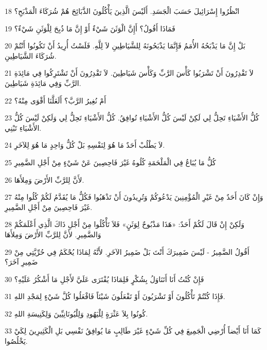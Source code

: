 \par 18 انْظُرُوا إِسْرَائِيلَ حَسَبَ الْجَسَدِ. أَلَيْسَ الَّذِينَ يَأْكُلُونَ الذَّبَائِحَ هُمْ شُرَكَاءَ الْمَذْبَحِ؟
\par 19 فَمَاذَا أَقُولُ؟ أَإِنَّ الْوَثَنَ شَيْءٌ أَوْ إِنَّ مَا ذُبِحَ لِلْوَثَنِ شَيْءٌ؟
\par 20 بَلْ إِنَّ مَا يَذْبَحُهُ الأُمَمُ فَإِنَّمَا يَذْبَحُونَهُ لِلشَّيَاطِينِ لاَ لِلَّهِ. فَلَسْتُ أُرِيدُ أَنْ تَكُونُوا أَنْتُمْ شُرَكَاءَ الشَّيَاطِينِ.
\par 21 لاَ تَقْدِرُونَ أَنْ تَشْرَبُوا كَأْسَ الرَّبِّ وَكَأْسَ شَيَاطِينَ. لاَ تَقْدِرُونَ أَنْ تَشْتَرِكُوا فِي مَائِدَةِ الرَّبِّ وَفِي مَائِدَةِ شَيَاطِينَ.
\par 22 أَمْ نُغِيرُ الرَّبَّ؟ أَلَعَلَّنَا أَقْوَى مِنْهُ؟
\par 23 كُلُّ الأَشْيَاءِ تَحِلُّ لِي لَكِنْ لَيْسَ كُلُّ الأَشْيَاءِ تُوافِقُ. كُلُّ الأَشْيَاءِ تَحِلُّ لِي وَلَكِنْ لَيْسَ كُلُّ الأَشْيَاءِ تَبْنِي.
\par 24 لاَ يَطْلُبْ أَحَدٌ مَا هُوَ لِنَفْسِهِ بَلْ كُلُّ وَاحِدٍ مَا هُوَ لِلآخَرِ.
\par 25 كُلُّ مَا يُبَاعُ فِي الْمَلْحَمَةِ كُلُوهُ غَيْرَ فَاحِصِينَ عَنْ شَيْءٍ مِنْ أَجْلِ الضَّمِيرِ
\par 26 لأَنَّ لِلرَّبِّ الأَرْضَ وَمِلأَهَا.
\par 27 وَإِنْ كَانَ أَحَدٌ مِنْ غَيْرِ الْمُؤْمِنِينَ يَدْعُوكُمْ وَتُرِيدُونَ أَنْ تَذْهَبُوا فَكُلُّ مَا يُقَدَّمُ لَكُمْ كُلُوا مِنْهُ غَيْرَ فَاحِصِينَ مِنْ أَجْلِ الضَّمِيرِ.
\par 28 وَلَكِنْ إِنْ قَالَ لَكُمْ أَحَدٌ: «هَذَا مَذْبُوحٌ لِوَثَنٍ» فَلاَ تَأْكُلُوا مِنْ أَجْلِ ذَاكَ الَّذِي أَعْلَمَكُمْ وَالضَّمِيرِ. لأَنَّ لِلرَّبِّ الأَرْضَ وَمِلأَهَا
\par 29 أَقُولُ الضَّمِيرُ - لَيْسَ ضَمِيرَكَ أَنْتَ بَلْ ضَمِيرُ الآخَرِ. لأَنَّهُ لِمَاذَا يُحْكَمُ فِي حُرِّيَّتِي مِنْ ضَمِيرِ آخَرَ؟
\par 30 فَإِنْ كُنْتُ أَنَا أَتَنَاوَلُ بِشُكْرٍ فَلِمَاذَا يُفْتَرَى عَلَيَّ لأَجْلِ مَا أَشْكُرُ عَلَيْهِ؟
\par 31 فَإِذَا كُنْتُمْ تَأْكُلُونَ أَوْ تَشْرَبُونَ أَوْ تَفْعَلُونَ شَيْئاً فَافْعَلُوا كُلَّ شَيْءٍ لِمَجْدِ اللهِ.
\par 32 كُونُوا بِلاَ عَثْرَةٍ لِلْيَهُودِ وَلِلْيُونَانِيِّينَ وَلِكَنِيسَةِ اللهِ.
\par 33 كَمَا أَنَا أَيْضاً أُرْضِي الْجَمِيعَ فِي كُلِّ شَيْءٍ غَيْرَ طَالِبٍ مَا يُوافِقُ نَفْسِي بَلِ الْكَثِيرِينَ لِكَيْ يَخْلُصُوا.

